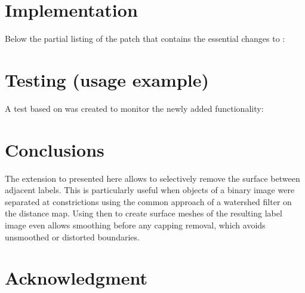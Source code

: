 \documentclass{InsightArticle}
\begin{document}
\section{Implementation}
\label{sec:impl}


Below the partial listing of the patch that contains the essential changes to :




\section{Testing (usage example)}
\label{sec:test}


A test based on  was created to monitor the newly added functionality:




\section{Conclusions}

The extension to  presented here allows to selectively remove the surface between adjacent labels.
This is particularly useful when objects of a binary image were separated at constrictions using the common approach of a watershed filter on the distance map.
Using  then to create surface meshes of the resulting label image even allows smoothing before any capping removal, which avoids unsmoothed or distorted boundaries.



\section{Acknowledgment}
\end{document}
